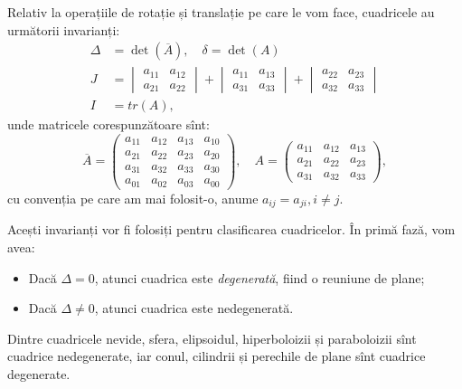 Relativ la operațiile de rotație și translație pe care le vom face, cuadricele
au următorii invarianți:
\begin{align*}
	\Delta &= \det(\overline{A}), \quad \delta = \det(A) \\
	J &= \begin{vmatrix}
	         a_{11} & a_{12} \\
	         a_{21} & a_{22}
         \end{vmatrix} + 
         \begin{vmatrix}
	         a_{11} & a_{13} \\
	         a_{31} & a_{33} 
         \end{vmatrix} + 
         \begin{vmatrix}
	         a_{22} & a_{23} \\
	         a_{32} & a_{33}
         \end{vmatrix} \\
    I &= tr(A),
\end{align*}
unde matricele corespunzătoare sînt: 
 \[
	\overline{A} = \begin{pmatrix}
	                   a_{11} & a_{12} & a_{13} & a_{10} \\
	                   a_{21} & a_{22} & a_{23} & a_{20} \\
	                   a_{31} & a_{32} & a_{33} & a_{30} \\
	                   a_{01} & a_{02} & a_{03} & a_{00}
                   \end{pmatrix}, \quad
    A = \begin{pmatrix}
	        a_{11} & a_{12} & a_{13} \\
	        a_{21} & a_{22} & a_{23} \\
	        a_{31} & a_{32} & a_{33}
        \end{pmatrix},
\]
cu convenția pe care am mai folosit-o, anume $a_{ij} = a_{ji}, i \neq j$.

Acești invarianți vor fi folosiți pentru clasificarea cuadricelor. În primă
fază, vom avea:
\begin{itemize}
	\item Dacă $\Delta = 0$, atunci cuadrica este \emph{degenerată}, fiind o
reuniune de plane;  
    \item Dacă $\Delta \neq 0$, atunci cuadrica este nedegenerată.
\end{itemize}

Dintre cuadricele nevide, sfera, elipsoidul, hiperboloizii și paraboloizii
sînt cuadrice nedegenerate, iar conul, cilindrii și perechile de plane sînt
cuadrice degenerate.

